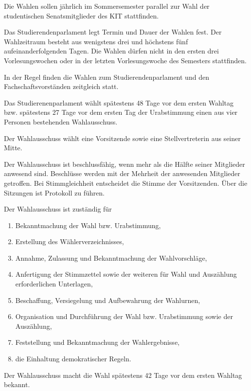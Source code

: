 \begin{jurdoc}
\label{wahl:walhtermin}
Die Wahlen sollen jährlich im Sommersemester parallel zur Wahl der studentischen Senatsmitglieder des KIT stattfinden. 

Das Studierendenparlament legt Termin und Dauer der Wahlen fest. Der Wahlzeitraum besteht aus wenigstens drei und höchstens fünf aufeinanderfolgenden Tagen. Die Wahlen dürfen nicht in den ersten drei Vorlesungswochen oder in der letzten Vorlesungswoche des Semesters stattfinden. 

In der Regel finden die Wahlen zum Studierendenparlament und den Fachschaftsvorständen zeitgleich statt.

\label{wahl:wahlausschuss}
Das Studierenenparlament wählt spätestens 48 Tage vor dem ersten Wahltag bzw. spätestens 27 Tage vor dem ersten Tag der Urabstimmung einen aus vier Personen bestehenden Wahlausschuss. 

Der Wahlausschuss wählt eine Vorsitzende sowie eine Stellvertreterin aus seiner Mitte.

Der Wahlausschuss ist beschlussfähig, wenn mehr als die Hälfte seiner Mitglieder anwesend sind. Beschlüsse werden mit der Mehrheit der anwesenden Mitglieder getroffen. Bei Stimmgleichheit entscheidet die Stimme der Vorsitzenden. Über die Sitzungen ist Protokoll zu führen.

Der Wahlausschuss ist zuständig für
\begin{enumerate}
    \item Bekanntmachung der Wahl bzw. Urabstimmung,
    \item Erstellung des Wählerverzeichnisses,
    \item Annahme, Zulassung und Bekanntmachung der Wahlvorschläge,
    \item Anfertigung der Stimmzettel sowie der weiteren für Wahl und Auszählung erforderlichen Unterlagen,
    \item Beschaffung, Versiegelung und Aufbewahrung der Wahlurnen,
    \item Organisation und Durchführung der Wahl bzw. Urabstimmung sowie der Auszählung,
    \item Feststellung und Bekanntmachung der Wahlergebnisse,
    \item die Einhaltung demokratischer Regeln.
\end{enumerate}

\label{wahl:bekanntmachung-wahl}
Der Wahlausschuss macht die Wahl spätestens 42 Tage vor dem ersten Wahltag bekannt.


\end{jurdoc}
